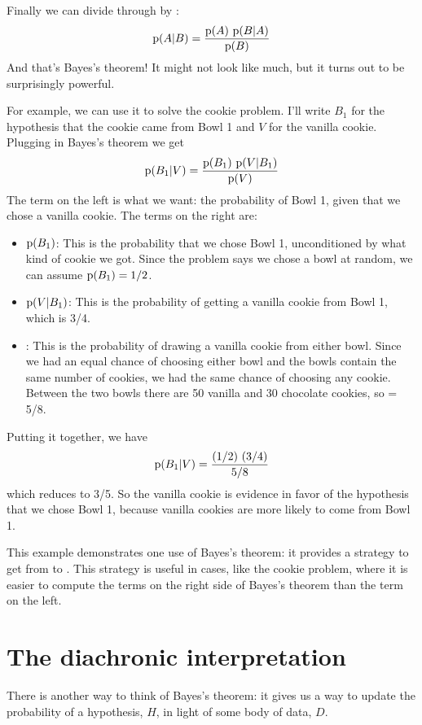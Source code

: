 \documentclass[12pt]{book}
\begin{document}
Finally we can divide through by :
%
\[ \mathrm{p}(A|B) = \frac{\mathrm{p}(A)~\mathrm{p}(B|A)}{\mathrm{p}(B)} \]
%
And that's Bayes's theorem!  It might not look like much, but
it turns out to be surprisingly powerful.

For example, we can use it to solve the cookie problem.  I'll write
$B_1$ for the hypothesis that the cookie came from Bowl 1
and $V$ for the vanilla cookie.  Plugging in Bayes's theorem
we get
%
\[ \mathrm{p}(B_1|V) = \frac{\mathrm{p}(B_1)~\mathrm{p}(V|B_1)}{\mathrm{p}(V)} \]
%
The term on the left is what we want: the probability of Bowl 1, given
that we chose a vanilla cookie.  The terms on the right are:

\begin{itemize}

\item $\mathrm{p}(B_1)$: This is the probability that we chose Bowl 1, unconditioned
by what kind of cookie we got.  Since the problem says we chose a
bowl at random, we can assume $\mathrm{p}(B_1) = 1/2$.

\item $\mathrm{p}(V|B_1)$: This is the probability of getting a vanilla cookie
from Bowl 1, which is 3/4.

\item {}: This is the probability of drawing a vanilla cookie from
either bowl.  Since we had an equal chance of choosing either bowl
and the bowls contain the same number of cookies, we had the same
chance of choosing any cookie.  Between the two bowls there are
50 vanilla and 30
chocolate cookies, so  = 5/8.

\end{itemize}

Putting it together, we have 
%
\[ \mathrm{p}(B_1|V) = \frac{(1/2)~(3/4)}{5/8} \]
%
which reduces to 3/5.  So the vanilla cookie is evidence in favor of
the hypothesis that we chose Bowl 1, because vanilla cookies are more
likely to come from Bowl 1.

This example demonstrates one use of Bayes's theorem: it provides
a strategy to get from  to .  This strategy is useful
in cases, like the cookie problem, where it is easier to compute
the terms on the right side of Bayes's theorem than the term on the
left.


\section{The diachronic interpretation}

There is another way to think of Bayes's theorem: it gives us a
way to update the probability of a hypothesis, $H$, in light of
some body of data, $D$.
\end{document}
